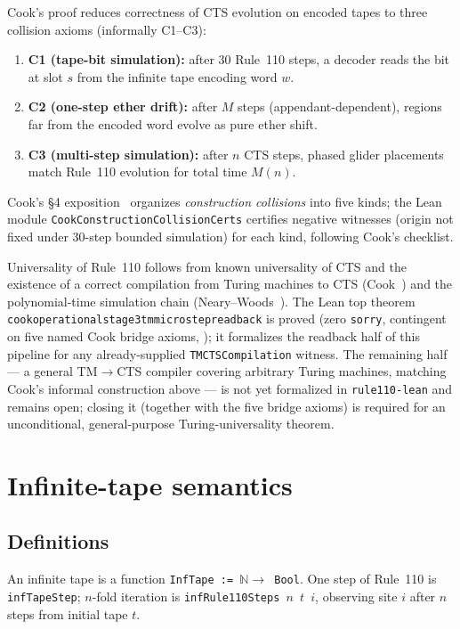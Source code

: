 \documentclass[11pt]{article}
\theoremstyle{remark}
\newcommand{\lean}[1]{%
  \penalty-100
  \begingroup\def\_{\textunderscore\allowbreak}\texttt{#1}\endgroup}
\begin{document}
Cook's proof reduces correctness of CTS evolution on encoded tapes to three collision
axioms (informally C1--C3):
\begin{enumerate}[leftmargin=1.5em]
  \item \textbf{C1 (tape-bit simulation):} after $30$ Rule~110 steps, a decoder reads the
    bit at slot $s$ from the infinite tape encoding word $w$.
  \item \textbf{C2 (one-step ether drift):} after $M$ steps (appendant-dependent), regions
    far from the encoded word evolve as pure ether shift.
  \item \textbf{C3 (multi-step simulation):} after $n$ CTS steps, phased glider placements
    match Rule~110 evolution for total time $M(n)$.
\end{enumerate}
Cook's \S4 exposition~\cite{Cook2009} organizes \emph{construction collisions} into five kinds;
the Lean module \texttt{CookConstructionCollisionCerts} certifies negative witnesses (origin
not fixed under $30$-step bounded simulation) for each kind, following Cook's checklist.

Universality of Rule~110 follows from known universality of CTS and the existence of
a correct compilation from Turing machines to CTS (Cook~\cite{Cook2009})
and the polynomial-time simulation chain (Neary--Woods~\cite{NearyW06}).
The Lean top theorem \lean{cook\_operational\_stage3\_tm\_microstep\_readback} is proved
(zero \texttt{sorry}, contingent on five named Cook bridge axioms, ); it
formalizes the readback half of this pipeline for any already-supplied
\lean{TMCTSCompilation} witness.  The remaining half --- a general TM$\to$CTS compiler
covering arbitrary Turing machines, matching Cook's informal construction above --- is
not yet formalized in \texttt{rule110-lean} and remains open; closing it (together with
the five bridge axioms) is required for an unconditional, general-purpose Turing-universality
theorem.

\section{Infinite-tape semantics}
\label{sec:inftape}

\subsection{Definitions}

An infinite tape is a function \texttt{InfTape := $\mathbb{N} \to$ Bool}.
One step of Rule~110 is \texttt{infTapeStep}; $n$-fold iteration is
\texttt{infRule110Steps $n$ $t$ $i$}, observing site $i$ after $n$ steps from initial tape $t$.
\end{document}
